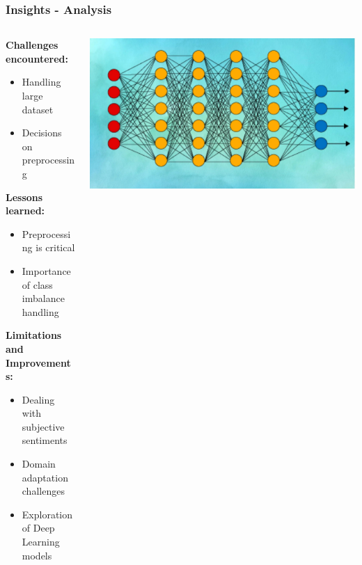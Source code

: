 \documentclass{beamer}
\begin{document}
\begin{frame}
\frametitle{Insights - Analysis}

\begin{columns}

\begin{column}{0.6\textwidth}
\textbf{Challenges encountered:}
\begin{itemize}
\item Handling large dataset
\item Decisions on preprocessing
\end{itemize}

\textbf{Lessons learned:}
\begin{itemize}
\item Preprocessing is critical
\item Importance of class imbalance handling
\end{itemize}

\textbf{Limitations and Improvements:}
\begin{itemize}
\item Dealing with subjective sentiments
\item Domain adaptation challenges
\item Exploration of Deep Learning models
\end{itemize}

\end{column}

\begin{column}{0.5\textwidth}
\includegraphics[width=1\textwidth]{ezgif.com-gif-maker.png}
\end{column}

\end{columns}

\end{frame}
\end{document}

